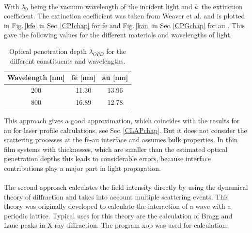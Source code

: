 \documentclass[a4paper,12pt,twoside]{article}
\begin{document}
            \\
With $\lambda_{ 0 }$ being the vacuum wavelength of the incident light and $k\,$ the extinction coefficient. The extinction coefficient was taken from Weaver et al. and is plotted in Fig.\,\ref{kfe} in Sec.\,\ref{CPIchap} for \gls{fe} and Fig.\,\ref{kau} in Sec.\,\ref{CPGchap} for \gls{au} \cite{Weaver}. This gave the following values for the different materials and wavelengths of light.
	    \begin{table}[H]
	    \centering
		    \caption{Optical penetration depth $\lambda_{OPD}$ for the different constituents and wavelengths.}
		    \begin{tabular}{ccc}
			    Wavelength [nm] & \gls{fe} [nm] & \gls{au} [nm] \\
		    	\hline
		    	200 & 11.30 & 13.96 \\
		    	800 & 16.89 & 12.78 \\
		    \end{tabular}
		        \label{opdtable}
        \end{table}
\noindent This approach gives a good approximation, which coincides with the results for \gls{au} for laser profile calculations, see Sec.\,\ref{CLAPchap}. But it does not consider the scattering processes at the \gls{fe}-\gls{au} interface and assumes bulk properties. In thin film systems with thicknesses, which are smaller than the estimated optical penetration depths this leads to considerable errors, because interface contributions play a major part in light propagation.
\\
\\
The second approach calculates the field intensity directly by using the dynamical theory of diffraction and takes into account multiple scattering events. This theory was originally developed to calculate the interaction of a wave with a periodic lattice. Typical uses for this theory are the calculation of Bragg and Laue peaks in X-ray diffraction. The program \gls{xop} was used for calculation.
    
\end{document}
